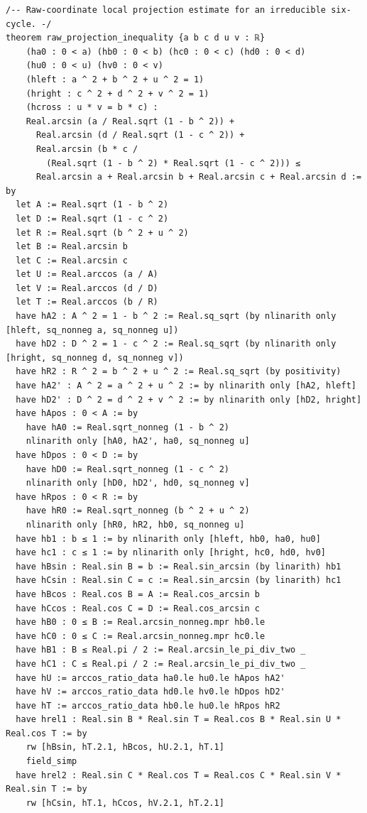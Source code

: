 \documentclass[11pt,a4paper]{article}
\begin{document}
\begin{Verbatim}[breaklines,breakanywhere,fontsize=\footnotesize]
/-- Raw-coordinate local projection estimate for an irreducible six-cycle. -/
theorem raw_projection_inequality {a b c d u v : ℝ}
    (ha0 : 0 < a) (hb0 : 0 < b) (hc0 : 0 < c) (hd0 : 0 < d)
    (hu0 : 0 < u) (hv0 : 0 < v)
    (hleft : a ^ 2 + b ^ 2 + u ^ 2 = 1)
    (hright : c ^ 2 + d ^ 2 + v ^ 2 = 1)
    (hcross : u * v = b * c) :
    Real.arcsin (a / Real.sqrt (1 - b ^ 2)) +
      Real.arcsin (d / Real.sqrt (1 - c ^ 2)) +
      Real.arcsin (b * c /
        (Real.sqrt (1 - b ^ 2) * Real.sqrt (1 - c ^ 2))) ≤
      Real.arcsin a + Real.arcsin b + Real.arcsin c + Real.arcsin d := by
  let A := Real.sqrt (1 - b ^ 2)
  let D := Real.sqrt (1 - c ^ 2)
  let R := Real.sqrt (b ^ 2 + u ^ 2)
  let B := Real.arcsin b
  let C := Real.arcsin c
  let U := Real.arccos (a / A)
  let V := Real.arccos (d / D)
  let T := Real.arccos (b / R)
  have hA2 : A ^ 2 = 1 - b ^ 2 := Real.sq_sqrt (by nlinarith only [hleft, sq_nonneg a, sq_nonneg u])
  have hD2 : D ^ 2 = 1 - c ^ 2 := Real.sq_sqrt (by nlinarith only [hright, sq_nonneg d, sq_nonneg v])
  have hR2 : R ^ 2 = b ^ 2 + u ^ 2 := Real.sq_sqrt (by positivity)
  have hA2' : A ^ 2 = a ^ 2 + u ^ 2 := by nlinarith only [hA2, hleft]
  have hD2' : D ^ 2 = d ^ 2 + v ^ 2 := by nlinarith only [hD2, hright]
  have hApos : 0 < A := by
    have hA0 := Real.sqrt_nonneg (1 - b ^ 2)
    nlinarith only [hA0, hA2', ha0, sq_nonneg u]
  have hDpos : 0 < D := by
    have hD0 := Real.sqrt_nonneg (1 - c ^ 2)
    nlinarith only [hD0, hD2', hd0, sq_nonneg v]
  have hRpos : 0 < R := by
    have hR0 := Real.sqrt_nonneg (b ^ 2 + u ^ 2)
    nlinarith only [hR0, hR2, hb0, sq_nonneg u]
  have hb1 : b ≤ 1 := by nlinarith only [hleft, hb0, ha0, hu0]
  have hc1 : c ≤ 1 := by nlinarith only [hright, hc0, hd0, hv0]
  have hBsin : Real.sin B = b := Real.sin_arcsin (by linarith) hb1
  have hCsin : Real.sin C = c := Real.sin_arcsin (by linarith) hc1
  have hBcos : Real.cos B = A := Real.cos_arcsin b
  have hCcos : Real.cos C = D := Real.cos_arcsin c
  have hB0 : 0 ≤ B := Real.arcsin_nonneg.mpr hb0.le
  have hC0 : 0 ≤ C := Real.arcsin_nonneg.mpr hc0.le
  have hB1 : B ≤ Real.pi / 2 := Real.arcsin_le_pi_div_two _
  have hC1 : C ≤ Real.pi / 2 := Real.arcsin_le_pi_div_two _
  have hU := arccos_ratio_data ha0.le hu0.le hApos hA2'
  have hV := arccos_ratio_data hd0.le hv0.le hDpos hD2'
  have hT := arccos_ratio_data hb0.le hu0.le hRpos hR2
  have hrel1 : Real.sin B * Real.sin T = Real.cos B * Real.sin U * Real.cos T := by
    rw [hBsin, hT.2.1, hBcos, hU.2.1, hT.1]
    field_simp
  have hrel2 : Real.sin C * Real.cos T = Real.cos C * Real.sin V * Real.sin T := by
    rw [hCsin, hT.1, hCcos, hV.2.1, hT.2.1]

\end{Verbatim}
\end{document}
